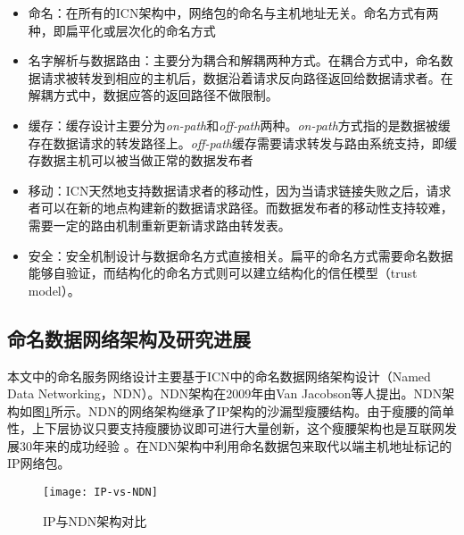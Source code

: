 \begin{itemize}
\item 命名：在所有的ICN架构中，网络包的命名与主机地址无关。命名方式有两种，即扁平化或层次化的命名方式
\item 名字解析与数据路由：主要分为耦合和解耦两种方式。在耦合方式中，命名数据请求被转发到相应的主机后，数据沿着请求反向路径返回给数据请求者。在解耦方式中，数据应答的返回路径不做限制。
\item 缓存：缓存设计主要分为\textit{on-path}和\textit{off-path}两种。\textit{on-path}方式指的是数据被缓存在数据请求的转发路径上。\textit{off-path}缓存需要请求转发与路由系统支持，即缓存数据主机可以被当做正常的数据发布者
\item 移动：ICN天然地支持数据请求者的移动性，因为当请求链接失败之后，请求者可以在新的地点构建新的数据请求路径。而数据发布者的移动性支持较难，需要一定的路由机制重新更新请求路由转发表。
\item 安全：安全机制设计与数据命名方式直接相关。扁平的命名方式需要命名数据能够自验证，而结构化的命名方式则可以建立结构化的信任模型（trust model）。
\end{itemize}

\subsection{命名数据网络架构及研究进展}
本文中的命名服务网络设计主要基于ICN中的命名数据网络架构设计（Named Data Networking，NDN）。NDN架构在2009年由Van Jacobson等人提出。\cite{jacobson2009networking}NDN架构如图\ref{fig:IP-vs-NDN}所示。NDN的网络架构继承了IP架构的沙漏型瘦腰结构。由于瘦腰的简单性，上下层协议只要支持瘦腰协议即可进行大量创新，这个瘦腰架构也是互联网发展30年来的成功经验
。在NDN架构中利用命名数据包来取代以端主机地址标记的IP网络包。

\begin{figure}[H]
  \centering
  \texttt{[image: IP-vs-NDN]}
  \caption{IP与NDN架构对比}
  \label{fig:IP-vs-NDN}
\end{figure}

